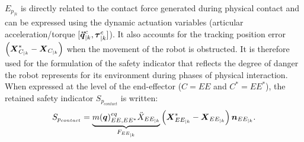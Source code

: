 \documentclass[letterpaper, 10 pt, conference]{ieeeconf}      %
\newcommand{\vect}[1]{\mbox{\boldmath${#1}$}}%
\begin{document}
$E_{p_{|k}}$ is directly related to the contact force generated during physical contact and can be expressed using the dynamic actuation variables (articular acceleration/torque $[\vect{\ddot{q}}_{|k}^{c}, \vect{\tau}_{|k}^{c}]$). It also accounts for the tracking position error  $\left(\vect{X}_{C_{|k}}^{*} - \vect{X}_{C_{|k}}\right)$ when the movement of the robot is obstructed. It is therefore used for the formulation of the safety indicator that reflects the degree of danger the robot represents for its environment during phases of physical interaction. When expressed at the level of the end-effector ($C=EE$ and $C^* = EE^*$), the retained safety indicator $S_{p_{contact}}$ is written:
\begin{equation}
S_{p_{contact}} = \underbrace{m(\vect{q})_{EE,EE^*}^{eq} \ddot{X}_{EE_{|k}}}_{F_{EE_{|k}}} \left(\vect{X}_{EE_{|k}}^{*} - \vect{X}_{EE_{|k}}\right) \vect{n}_{EE_{|k}}.
\label{eq:Ep_constr_221}
\end{equation}
\end{document}
